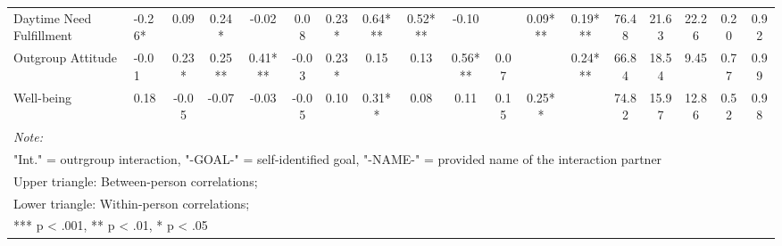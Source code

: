 \begin{sidewaystable}
{\begin{tabular}[t]{llcccccccccccccccc}
Daytime Need Fulfillment & -0.26* & 0.09 & 0.24* & -0.02 & 0.08 & 0.23* & 0.64*** & 0.52*** & -0.10 &  & 0.09*** & 0.19*** & 76.48 & 21.63 & 22.26 & 0.20 & 0.92\\
\addlinespace
Outgroup Attitude & -0.01 & 0.23* & 0.25** & 0.41*** & -0.03 & 0.23* & 0.15 & 0.13 & 0.56*** & 0.07 &  & 0.24*** & 66.84 & 18.54 & 9.45 & 0.77 & 0.99\\
Well-being & 0.18 & -0.05 & -0.07 & -0.03 & -0.05 & 0.10 & 0.31** & 0.08 & 0.11 & 0.15 & 0.25** &  & 74.82 & 15.97 & 12.86 & 0.52 & 0.98\\
\bottomrule
\multicolumn{18}{l}{\rule{0pt}{1em}\textit{Note: }}\\
\multicolumn{18}{l}{\rule{0pt}{1em}"Int." = outrgroup interaction, "-GOAL-" = self-identified goal, "-NAME-" = provided name of the interaction partner}\\
\multicolumn{18}{l}{\rule{0pt}{1em}Upper triangle: Between-person correlations;}\\
\multicolumn{18}{l}{\rule{0pt}{1em}Lower triangle: Within-person correlations;}\\
\multicolumn{18}{l}{\rule{0pt}{1em}*** p < .001, ** p < .01,  * p < .05}\\
\end{tabular}}
\end{sidewaystable}
